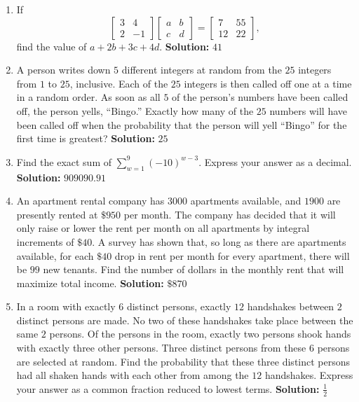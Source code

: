 \documentclass[10pt]{article}
\begin{document}
\begin{enumerate}
\item If
\[
\begin{bmatrix}3&4\\2&-1\end{bmatrix}
\begin{bmatrix}a&b\\c&d\end{bmatrix}
=
\begin{bmatrix}7&55\\12&22\end{bmatrix},
\]
find the value of \(a+2b+3c+4d\). \quad\textbf{Solution:} \(41\)

\item A person writes down \(5\) different integers at random from the \(25\) integers from \(1\) to \(25\), inclusive. Each of the \(25\) integers is then called off one at a time in a random order. As soon as all \(5\) of the person's numbers have been called off, the person yells, “Bingo.” Exactly how many of the \(25\) numbers will have been called off when the probability that the person will yell “Bingo” for the first time is greatest? \quad\textbf{Solution:} \(25\)

\item Find the exact sum of \(\displaystyle\sum_{w=1}^{9}(-10)^{w-3}\). Express your answer as a decimal. \quad\textbf{Solution:} \(909090.91\)

\item An apartment rental company has \(3000\) apartments available, and \(1900\) are presently rented at \(\$950\) per month. The company has decided that it will only raise or lower the rent per month on all apartments by integral increments of \(\$40\). A survey has shown that, so long as there are apartments available, for each \(\$40\) drop in rent per month for every apartment, there will be \(99\) new tenants. Find the number of dollars in the monthly rent that will maximize total income. \quad\textbf{Solution:} \(\$870\)

\item In a room with exactly \(6\) distinct persons, exactly \(12\) handshakes between \(2\) distinct persons are made. No two of these handshakes take place between the same \(2\) persons. Of the persons in the room, exactly two persons shook hands with exactly three other persons. Three distinct persons from these \(6\) persons are selected at random. Find the probability that these three distinct persons had all shaken hands with each other from among the \(12\) handshakes. Express your answer as a common fraction reduced to lowest terms. \quad\textbf{Solution:} \(\frac{1}{2}\)


\end{enumerate}
\end{document}

